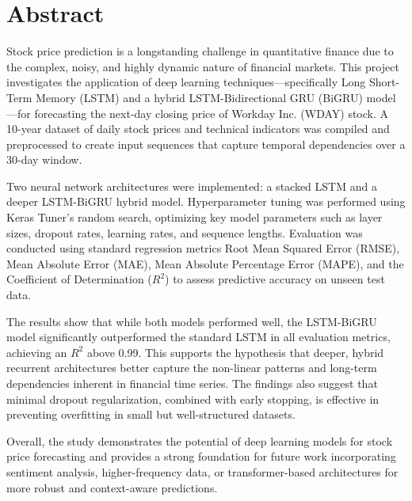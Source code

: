 \clearpage
\pagestyle{empty} 

\section*{Abstract}

Stock price prediction is a longstanding challenge in quantitative finance due 
to the complex, noisy, and highly dynamic nature of financial markets. This project
investigates the application of deep learning techniques—specifically Long Short-Term
Memory (LSTM) and a hybrid LSTM-Bidirectional GRU (BiGRU) model—for forecasting the 
next-day closing price of Workday Inc. (WDAY) stock. A 10-year dataset of daily stock
prices and technical indicators was compiled and preprocessed to create input 
sequences that capture temporal dependencies over a 30-day window.

Two neural network architectures were implemented: a stacked LSTM and a 
deeper LSTM-BiGRU hybrid model. Hyperparameter tuning was performed using Keras 
Tuner's random search, optimizing key model parameters such as layer sizes, dropout
rates, learning rates, and sequence lengths. Evaluation was conducted using standard 
regression metrics Root Mean Squared Error (RMSE), Mean Absolute Error (MAE), Mean 
Absolute Percentage Error (MAPE), and the Coefficient of Determination ($R^2$) to 
assess predictive accuracy on unseen test data.

The results show that while both models performed well, the LSTM-BiGRU model 
significantly outperformed the standard LSTM in all evaluation metrics, achieving an 
$R^2$ above 0.99. This supports the hypothesis that deeper, hybrid recurrent 
architectures better capture the non-linear patterns and long-term dependencies 
inherent in financial time series. The findings also suggest that minimal dropout 
regularization, combined with early stopping, is effective in preventing overfitting
in small but well-structured datasets.

Overall, the study demonstrates the potential of deep learning models for stock price
forecasting and provides a strong foundation for future work incorporating sentiment
analysis, higher-frequency data, or transformer-based architectures for more robust 
and context-aware predictions. 
   